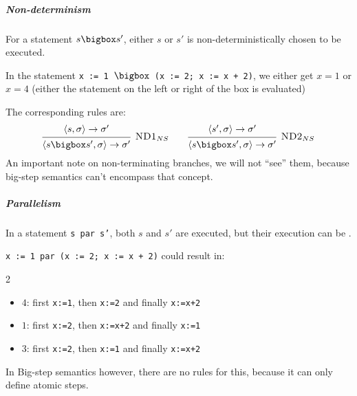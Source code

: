 \subparagraph{Non-determinism}
For a statement $s \bigbox s'$, either $s$ or $s'$ is non-deterministically chosen to be executed.

\inlineexample In the statement \texttt{x := 1 $\bigbox$ (x := 2; x := x + 2)}, we either get $x = 1$ or $x = 4$
(either the statement on the left or right of the box is evaluated)

The corresponding rules are:
\[
    \begin{prooftree}
        \hypo{\langle s, \sigma \rangle \rightarrow \sigma'}
        \infer1[\textsc{ND1}$_{NS}$]{\langle s \bigbox s', \sigma \rangle \rightarrow \sigma'}
    \end{prooftree}
    \qquad
    \begin{prooftree}
        \hypo{\langle s', \sigma \rangle \rightarrow \sigma'}
        \infer1[\textsc{ND2}$_{NS}$]{\langle s \bigbox s', \sigma \rangle \rightarrow \sigma'}
    \end{prooftree}
\]
An important note on non-terminating branches, we will not ``see'' them, because big-step semantics can't encompass that concept.


\subparagraph{Parallelism}
In a statement \texttt{s par s'}, both $s$ and $s'$ are executed, but their execution can be .

\inlineexample \texttt{x := 1 par (x := 2; x := x + 2)} could result in:
\begin{multicols}{2}
    \begin{itemize}
        \item $4$: first \texttt{x:=1}, then \texttt{x:=2} and finally \texttt{x:=x+2}
        \item $1$: first \texttt{x:=2}, then \texttt{x:=x+2} and finally \texttt{x:=1}
        \item $3$: first \texttt{x:=2}, then \texttt{x:=1} and finally \texttt{x:=x+2}
    \end{itemize}
\end{multicols}
In Big-step semantics however, there are no rules for this, because it can only define atomic steps.

